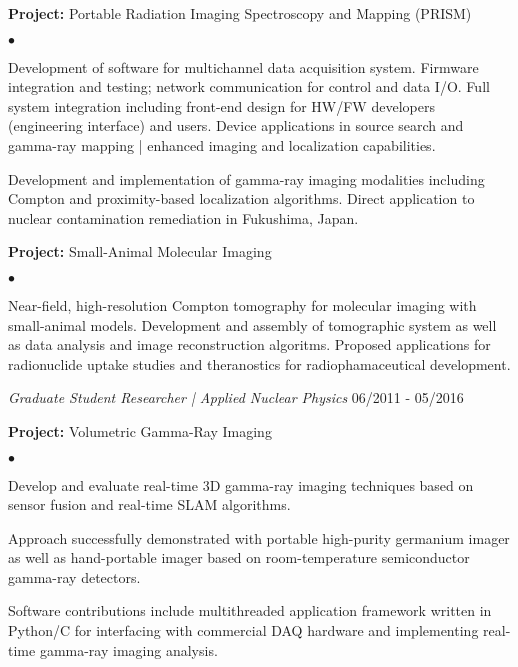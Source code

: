 \documentclass[margin,line]{res}
\newenvironment{list1}{
  \begin{list}{\ding{113}}{%
      \setlength{\itemsep}{0in}
      \setlength{\parsep}{0in} \setlength{\parskip}{0in}
      \setlength{\topsep}{0in} \setlength{\partopsep}{0in} 
      \setlength{\leftmargin}{0.17in}}}{\end{list}}
\newenvironment{list2}{
  \begin{list}{$\bullet$}{%
      \setlength{\itemsep}{0in}
      \setlength{\parsep}{0in} \setlength{\parskip}{0in}
      \setlength{\topsep}{0in} \setlength{\partopsep}{0in} 
      \setlength{\leftmargin}{0.2in}}}{\end{list}}
\begin{document}
\begin{resume}
\begin{list1}
  \item[] {\bf \small Project:} Portable Radiation Imaging Spectroscopy and Mapping (PRISM)
  \begin{list2}
    \item Development of software for multichannel data acquisition system.
          Firmware integration and testing; network communication for control
          and data I/O.
          Full system integration including front-end design for HW/FW
          developers (engineering interface) and users.
          Device applications in source search and gamma-ray mapping | 
          enhanced imaging and localization capabilities.
    \item Development and implementation of gamma-ray imaging modalities
          including Compton and proximity-based localization algorithms.
          Direct application to nuclear contamination remediation in 
          Fukushima, Japan.
  \end{list2}
  \item[] {\bf \small Project:} Small-Animal Molecular Imaging
  \begin{list2}
    \item Near-field, high-resolution Compton tomography for molecular imaging
          with small-animal models.
          Development and assembly of tomographic system as well as data 
          analysis and image reconstruction algoritms.
          Proposed applications for radionuclide uptake studies and theranostics
          for radiophamaceutical development.
  \end{list2}
\end{list1}

{\em Graduate Student Researcher | Applied Nuclear Physics} \hfill 06/2011 - 05/2016

\begin{list1}
  \item[] {\bf \small Project:} Volumetric Gamma-Ray Imaging
  \begin{list2}
    \item Develop and evaluate real-time 3D gamma-ray imaging techniques based
          on sensor fusion and real-time SLAM algorithms.
    \item Approach successfully demonstrated with portable high-purity 
          germanium imager as well as hand-portable imager based on 
          room-temperature semiconductor gamma-ray detectors.
    \item Software contributions include multithreaded application framework
          written in Python/C for interfacing with commercial DAQ hardware and
          implementing real-time gamma-ray imaging analysis.
  \end{list2}
\end{list1}


\end{resume}
\end{document}
